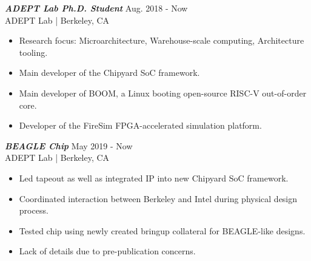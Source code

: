 \documentclass[letter]{res}
\begin{document}
\begin{resume}
{\sl \textbf{ADEPT Lab Ph.D. Student}} \hfill Aug. 2018 - Now\\
ADEPT Lab | Berkeley, CA \newline

 \vspace{-4mm}

 \begin{itemize}
 \item Research focus: Microarchitecture, Warehouse-scale computing, Architecture tooling.
 \item Main developer of the Chipyard SoC framework.
 \item Main developer of BOOM, a Linux booting open-source RISC-V out-of-order core.
 \item Developer of the FireSim FPGA-accelerated simulation platform.
 \end{itemize}

\vspace{-2mm}

%
%
%

{\sl \textbf{BEAGLE Chip}} \hfill May 2019 - Now\\
ADEPT Lab | Berkeley, CA \newline

 \vspace{-4mm}

 \begin{itemize}
 \item Led tapeout as well as integrated IP into new Chipyard SoC framework.
 \item Coordinated interaction between Berkeley and Intel during physical design process.
 \item Tested chip using newly created bringup collateral for BEAGLE-like designs.
 \item Lack of details due to pre-publication concerns.
 \end{itemize}


\end{resume}
\end{document}

